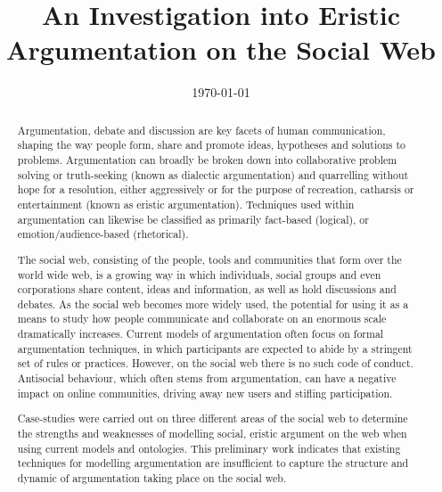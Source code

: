 \documentclass[twoside]{ecsthesis}      %
\begin{document}
\frontmatter
\title      {An Investigation into Eristic Argumentation on the Social Web}
\addresses  {\groupname\\\deptname\\\univname}
\date       {\today}
\subject    {}
\keywords   {}
\maketitle
\begin{abstract}
Argumentation, debate and discussion are key facets of human communication, shaping the way people form, share and promote ideas, hypotheses and solutions to problems. Argumentation can broadly be broken down into collaborative problem solving or truth-seeking (known as dialectic argumentation) and quarrelling without hope for a resolution, either aggressively or for the purpose of recreation, catharsis or entertainment (known as eristic argumentation). Techniques used within argumentation can likewise be classified as primarily fact-based (logical), or emotion/audience-based (rhetorical).

The social web, consisting of the people, tools and communities that form over the world wide web, is a growing way in which individuals, social groups and even corporations share content, ideas and information, as well as hold discussions and debates. As the social web becomes more widely used, the potential for using it as a means to study how people communicate and collaborate on an enormous scale dramatically increases. Current models of argumentation often focus on formal argumentation techniques, in which participants are expected to abide by a stringent set of rules or practices. However, on the social web there is no such code of conduct. Antisocial behaviour, which often stems from argumentation, can have a negative impact on online communities, driving away new users and stifling participation.

Case-studies were carried out on three different areas of the social web to determine the strengths and weaknesses of modelling social, eristic argument on the web when using current models and ontologies. This preliminary work indicates that existing techniques for modelling argumentation are insufficient to capture the structure and dynamic of argumentation taking place on the social web. 


\end{abstract}
\end{document}

